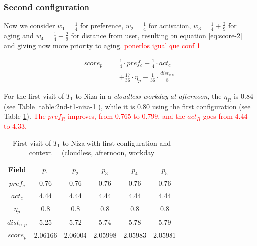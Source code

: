 \subsubsection{Second configuration} \label{section:experiment-2}
Now we consider $w_1 = \frac{1}{4}$ for preference, $w_2 = \frac{1}{4}$ for activation, $w_3 = \frac{1}{4} + \frac{2}{9}$ for aging and $w_4 = \frac{1}{4} - \frac{2}{9}$ for distance from user, resulting on equation \ref{eq:score-2} and giving now more priority to aging. \textcolor{red}{ponerlos igual que conf 1}


\begin{equation} \label{eq:score-2}
    \begin{split}
        score_p = \ &\frac{1}{4} \cdot pref_c + \frac{1}{4} \cdot act_c \\
                                        &+ \frac{17}{36} \cdot \eta_p - \frac{1}{36} \cdot \frac{dist_{u,p}}{8}
    \end{split}
\end{equation}

For the first visit of $T_1$ to Niza in a {\it cloudless workday at afternoon}, the $\eta_R$ is $0.84$
(see Table \ref{table:2nd-t1-niza-1}), while it is $0.80$ using the first configuration (see Table \ref{table:1st-t1-niza-1}). \textcolor{red}{The $pref_R$ improves, from $0.765$ to $0.799$, and the $act_R$ goes from $4.44$ to $4.33$.}

\begin{table}[h!]
    \centering
        \caption{First visit of $T_1$ to Niza with first configuration and context = (cloudless, afternoon, workday}
    \label{table:1st-t1-niza-1}
    \begin{tabular}{ |c|c|c|c|c|c| } 
        \hline
        Field   & $p_1$ & $p_2$ & $p_3$ & $p_4$ & $p_5$ \\
        \hline
        $pref_c$    &  0.76 & 0.76 & 0.76 & 0.76 & 0.76 \\
        $act_c$     & 4.44 & 4.44 & 4.44 & 4.44 & 4.44  \\
        $\eta_p$    & 0.8 & 0.8 & 0.8 & 0.8 & 0.8 \\
        $dist_{u,p}$ & 5.25 & 5.72 & 5.74 & 5.78 & 5.79 \\
        $score_p$    & 2.06166 & 2.06004 & 2.05998 & 2.05983 & 2.05981 \\
        
        \hline
    \end{tabular}
\end{table}

